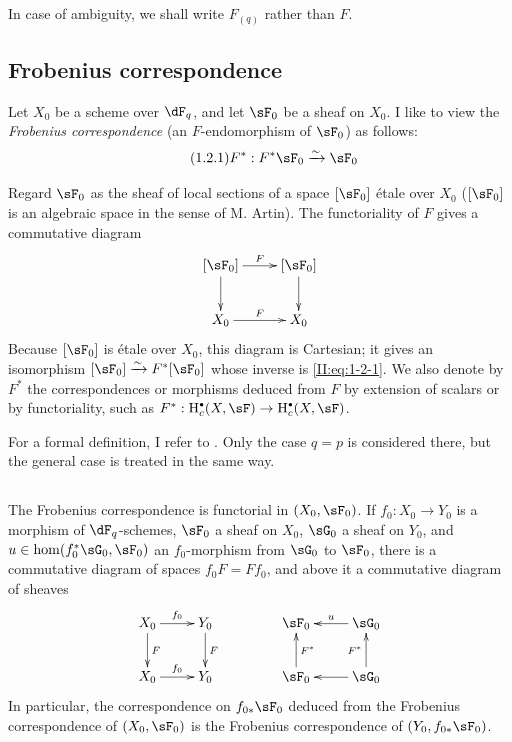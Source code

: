 In case of ambiguity, we shall write $F_{(q)}$ rather than $F$.










\subsection{Frobenius correspondence}\label{II:1-2}

Let $X_0$ be a scheme over $\dF_q$, and let $\sF_0$ be a sheaf on $X_0$. I
like to view the \emph{Frobenius correspondence} (an $F$-endomorphism of
$\sF_0$) as follows:
\begin{equation*}\tag{1.2.1}\label{II:eq:1-2-1}
  F^* : F^*\sF_0 \iso \sF_0
\end{equation*}

Regard $\sF_0$ as the sheaf of local sections of a space $[\sF_0]$ étale over
$X_0$ ($[\sF_0]$ is an algebraic space in the sense of M. Artin). The
functoriality of $F$ gives a commutative diagram
\[\xymatrix{
  [\sF_0] \ar[r]^-F \ar[d]
    & [\sF_0] \ar[d] \\
  X_0 \ar[r]^F
    & X_0
}\]
Because $[\sF_0]$ is étale over $X_0$, this diagram is Cartesian; it gives an
isomorphism $[\sF_0]\iso F^*[\sF_0]$ whose inverse is
\eqref{II:eq:1-2-1}. We also denote by $F^*$ the correspondences or morphisms
deduced from $F$ by extension of scalars or by functoriality, such as
$F^*:\h_c^\bullet(X,\sF)\to \h_c^\bullet(X,\sF)$.

For a formal definition, I refer to \cite[XI.1,2]{sga5}. Only the case
$q=p$ is considered there, but the general case is treated in the same way.






\subsection{}\label{II:1-3}

The Frobenius correspondence is functorial in $(X_0,\sF_0)$. If
$f_0:X_0\to Y_0$ is a morphism of $\dF_q$-schemes, $\sF_0$ a sheaf on $X_0$,
$\sG_0$ a sheaf on $Y_0$, and
$u\in\hom(f_0^*\sG_0,\sF_0)$ an $f_0$-morphism from $\sG_0$ to $\sF_0$, there
is a commutative diagram of spaces $f_0 F = F f_0$, and above it a
commutative diagram of sheaves
\[\xymatrix{
  X_0 \ar[r]^-{f_0} \ar[d]^-F
    & Y_0 \ar[d]^-F \\
  X_0 \ar[r]^-{f_0}
    & Y_0
}\qquad\qquad
\xymatrix{
  \sF_0
    & \ar[l]_-u \sG_0 \\
  \sF_0 \ar[u]_-{F^*}
    & \ar[l] \sG_0 \ar[u]^-{F^*}
}\]
In particular, the correspondence on $f_{0*}\sF_0$ deduced from the
Frobenius correspondence of $(X_0,\sF_0)$ is the Frobenius correspondence of
$(Y_0,f_{0*}\sF_0)$.







